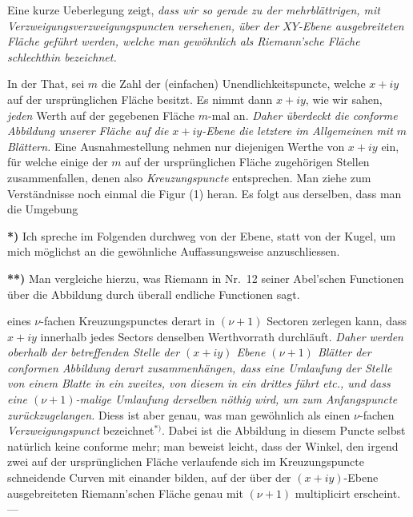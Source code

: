 \documentclass{article}
\begin{document}
Eine kurze Ueberlegung zeigt, \emph{dass wir so gerade zu der mehrblättrigen, mit Verzweigungsverzweigungspuncten versehenen, über der $XY$-Ebene ausgebreiteten Fläche geführt werden, welche man gewöhnlich als Riemann'sche Fläche schlechthin bezeichnet.}

In der That, sei $m$ die Zahl der (einfachen) Unendlichkeitspuncte, welche $x + iy$ auf der ursprünglichen Fläche besitzt. Es nimmt dann $x + iy$, wie wir sahen, \emph{jeden} Werth auf der gegebenen Fläche $m$-mal an. \emph{Daher überdeckt die conforme Abbildung unserer Fläche auf die $x + iy$-Ebene die letztere im Allgemeinen mit $m$ Blättern.} Eine Ausnahmestellung nehmen nur diejenigen Werthe von $x + iy$ ein, für welche einige der $m$ auf der ursprünglichen Fläche zugehörigen Stellen zusammenfallen, denen also \emph{Kreuzungspuncte} entsprechen. Man ziehe zum Verständnisse noch einmal die Figur (1) heran. Es folgt aus derselben, dass man die Umgebung

\textbf{*)} Ich spreche im Folgenden durchweg von der Ebene, statt von der Kugel, um mich möglichst an die gewöhnliche Auffassungsweise anzuschliessen.

\textbf{**)} Man vergleiche hierzu, was Riemann in Nr.~12 seiner Abel'schen Functionen über die Abbildung durch überall endliche Functionen sagt.

eines $\nu$-fachen Kreuzungspunctes derart in $(\nu + 1)$ Sectoren zerlegen kann, dass $x + iy$ innerhalb jedes Sectors denselben Werthvorrath durchläuft. \emph{Daher werden oberhalb der betreffenden Stelle der $(x + iy)$ Ebene $(\nu + 1)$ Blätter der conformen Abbildung derart zusammenhängen, dass eine Umlaufung der Stelle von einem Blatte in ein zweites, von diesem in ein drittes führt etc., und dass eine $(\nu + 1)$-malige Umlaufung derselben nöthig wird, um zum Anfangspuncte zurückzugelangen.} Diess ist aber genau, was man gewöhnlich als einen $\nu$-fachen \emph{Verzweigungspunct} bezeichnet${}^{*)}$. Dabei ist die Abbildung in diesem Puncte selbst natürlich keine conforme mehr; man beweist leicht, dass der Winkel, den irgend zwei auf der ursprünglichen Fläche verlaufende sich im Kreuzungspuncte schneidende Curven mit einander bilden, auf der über der $(x + iy)$-Ebene ausgebreiteten Riemann'schen Fläche genau mit $(\nu + 1)$ multiplicirt erscheint. ---
\end{document}
